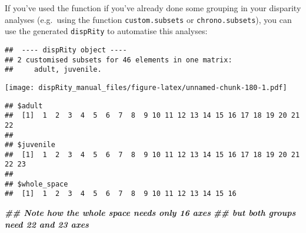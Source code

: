 \documentclass[
]{book}
\newenvironment{Shaded}{\begin{snugshade}}{\end{snugshade}}
\newcommand{\DocumentationTok}[1]{\textcolor[rgb]{0.56,0.35,0.01}{\textbf{\textit{#1}}}}
\newcommand{\FunctionTok}[1]{\textcolor[rgb]{0.13,0.29,0.53}{\textbf{#1}}}
\newcommand{\NormalTok}[1]{#1}
\newcommand{\OtherTok}[1]{\textcolor[rgb]{0.56,0.35,0.01}{#1}}
\newcommand{\SpecialCharTok}[1]{\textcolor[rgb]{0.81,0.36,0.00}{\textbf{#1}}}
\begin{document}
If you've used the function if you've already done some grouping in your disparity analyses (e.g.~using the function \texttt{custom.subsets} or \texttt{chrono.subsets}), you can use the generated \texttt{dispRity} to automatise this analyses:

\begin{Shaded}
\end{Shaded}

\begin{verbatim}
##  ---- dispRity object ---- 
## 2 customised subsets for 46 elements in one matrix:
##     adult, juvenile.
\end{verbatim}

\begin{Shaded}
\end{Shaded}

\texttt{[image: dispRity\_manual\_files/figure-latex/unnamed-chunk-180-1.pdf]}

\begin{Shaded}
\end{Shaded}

\begin{verbatim}
## $adult
##  [1]  1  2  3  4  5  6  7  8  9 10 11 12 13 14 15 16 17 18 19 20 21 22
## 
## $juvenile
##  [1]  1  2  3  4  5  6  7  8  9 10 11 12 13 14 15 16 17 18 19 20 21 22 23
## 
## $whole_space
##  [1]  1  2  3  4  5  6  7  8  9 10 11 12 13 14 15 16
\end{verbatim}

\begin{Shaded}
\begin{Highlighting}[]
\DocumentationTok{\#\# Note how the whole space needs only 16 axes}
\DocumentationTok{\#\# but both groups need 22 and 23 axes}
\end{Highlighting}
\end{Shaded}
\end{document}
